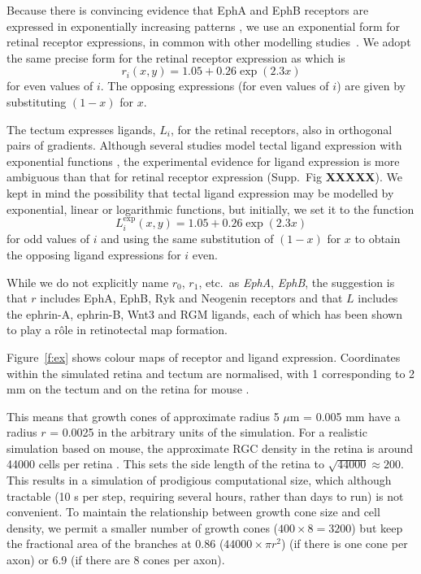 \documentclass[11pt, a4paper]{article}
\begin{document}
Because there is convincing evidence that EphA and EphB receptors are
expressed in exponentially increasing
patterns \citep{reber_relative_2004,feldheim_genetic_2000,brown_topographic_2000,koulakov_stochastic_2004},
we use an exponential form for retinal receptor expressions, in common with
other modelling
studies~\citep{reber_relative_2004,koulakov_stochastic_2004,simpson_simple_2011}.
We adopt the same precise form for the retinal receptor expression
as \citet{simpson_simple_2011} which is
\begin{equation} \label{e:retrcpt}
r_i(x,y) = 1.05 + 0.26 \exp(2.3 x)
\end{equation}
for even values of $i$. The opposing expressions (for even values of $i$)
are given by substituting $(1-x)$ for $x$.

The tectum expresses ligands, $L_i$, for the retinal receptors, also
in orthogonal pairs of gradients. Although several studies model tectal ligand
expression with exponential functions \citep{koulakov_stochastic_2004}, the
experimental evidence for ligand expression is more ambiguous than that for
retinal receptor expression (Supp.~Fig
\textbf{XXXXX}). We kept in mind the possibility that tectal ligand
expression may be modelled by exponential, linear or logarithmic functions,
but initially, we set it to the function
\begin{equation} \label{e:tecligexp}
L_i^{\text{exp}}(x,y) = 1.05 + 0.26 \exp(2.3 x)
\end{equation}
for odd values of $i$ and using the same substitution of $(1-x)$ for $x$ to
obtain the opposing ligand expressions for $i$ even.

While we do not explicitly name $r_0$, $r_1$,
etc.~as \emph{EphA}, \emph{EphB}, the suggestion is that $r$ includes EphA,
EphB, Ryk \citep{schmitt_wntryk_2006} and
Neogenin \citep{rajagopalan_neogenin_2004} receptors and that $L$ includes the
ephrin-A, ephrin-B, Wnt3 \citep{schmitt_wntryk_2006} and
RGM \citep{monnier_rgm_2002} ligands, each of which has been shown to play a
r\^ole in retinotectal map formation.

Figure~\ref{f:ex} shows colour maps of receptor and ligand
expression. Coordinates within the simulated retina and tectum are normalised,
with 1 corresponding to 2 mm on the tectum and on the retina for
mouse \citep{reber_relative_2004}.

\color{grey}
This means that growth cones of approximate
radius 5 $\mu$m = 0.005 mm \citep{goodhill_can_2016} have a radius $r$ =
0.0025 in the arbitrary units of the simulation. For a realistic simulation
based on mouse, the approximate RGC density in the retina is around 44000
cells per retina \citep{jeon_major_1998}. This sets the side length of the
retina to $\sqrt{44000} \approx 200$. This results in a simulation of
prodigious computational size, which although tractable (10 s per step,
requiring several hours, rather than days to run) is not convenient. To
maintain the relationship between growth cone size and cell density, we permit
a smaller number of growth cones ($400\times8=3200$) but keep the fractional
area of the branches at 0.86 ($44000 \times \pi r^2$) (if there is one cone
per axon) or 6.9 (if there are 8 cones per axon).
\end{document}
